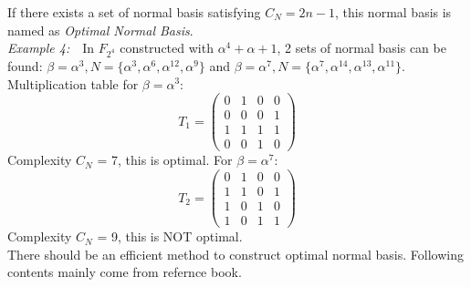 \documentclass[conference]{IEEEtran}
\begin{document}
If there exists a set of normal basis satisfying $C_N = 2n - 1$, this normal basis is named as
\emph{Optimal Normal Basis}.\\

\textit{Example 4:}\ \ In $F_{2^4}$ constructed with $\alpha^4 + \alpha + 1$, 2 sets of normal basis can be found:
$\beta = \alpha^3, N = \{ \alpha^3, \alpha^6, \alpha^{12}, \alpha^9\}$ and 
$\beta = \alpha^7, N = \{\alpha^7, \alpha^{14}, \alpha^{13}, \alpha^{11}\}$. Multiplication table for $\beta = \alpha^3$:
\begin{equation}
T_1 = \left(
\begin{array}{lccr}
0 & 1 & 0 & 0\\
0 & 0 & 0 & 1\\
1 & 1 & 1 & 1\\
0 & 0 & 1 & 0
\end{array} \right)
\end{equation}
Complexity $C_N$ = 7, this is optimal. For $\beta = \alpha^7$:
\begin{equation}
T_2 = \left(
\begin{array}{lccr}
0 & 1 & 0 & 0\\
1 & 1 & 0 & 1\\
1 & 0 & 1 & 0\\
1 & 0 & 1 & 1
\end{array} \right)
\end{equation}
Complexity $C_N$ = 9, this is NOT optimal.\\

There should be an efficient method to construct optimal normal basis. Following contents mainly come from refernce book\cite{ECC}.
\end{document}

